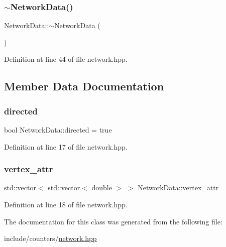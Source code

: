 \subsubsection{\texorpdfstring{$\sim$\+Network\+Data()}{~NetworkData()}}
{\footnotesize\ttfamily Network\+Data\+::$\sim$\+Network\+Data (\begin{DoxyParamCaption}{ }\end{DoxyParamCaption})\hspace{0.3cm}{\ttfamily [inline]}}



Definition at line 44 of file network.\+hpp.



\subsection{Member Data Documentation}
\mbox{\label{class_network_data_a5e67b89f22ad1151680a5f4428c6c780}} 
\subsubsection{\texorpdfstring{directed}{directed}}
{\footnotesize\ttfamily bool Network\+Data\+::directed = true}



Definition at line 17 of file network.\+hpp.

\mbox{\label{class_network_data_a3dc3e5549abc6daa85f30dbdc504ecac}} 
\subsubsection{\texorpdfstring{vertex\+\_\+attr}{vertex\_attr}}
{\footnotesize\ttfamily std\+::vector$<$ std\+::vector$<$ double $>$ $>$ Network\+Data\+::vertex\+\_\+attr}



Definition at line 18 of file network.\+hpp.



The documentation for this class was generated from the following file\+:\begin{DoxyCompactItemize}
\item 
include/counters/\hyperlink{network_8hpp}{network.\+hpp}\end{DoxyCompactItemize}
